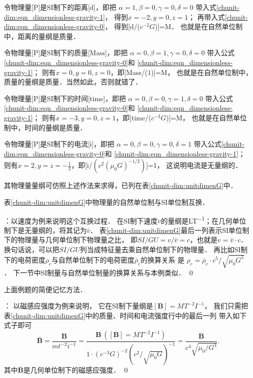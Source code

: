 令物理量[\si{P}]是SI制下的距离[\si{d}]，即把
$\alpha=1,\beta=0,\gamma=0,\delta=0$
带入式\eqref{chunit-dim:eqn_dimensionless-gravity-1}，
得到$x=-2,y=0,z=1$；
再带入式\eqref{chunit-dim:eqn_dimensionless-gravity-0}，
得到[\si{d}/($c^{-2}G$)]=\si{M}．
也就是在自然单位制中，距离的量纲是质量．

令物理量[\si{P}]是SI制下的质量[\si{Mass}]，即把
$\alpha=0,\beta=1,\gamma=0,\delta=0$
带入公式\eqref{chunit-dim:eqn_dimensionless-gravity-0}和
\eqref{chunit-dim:eqn_dimensionless-gravity-1}；
则有$x=0,y=0,z=0$，即[\si{Mass}/($1$)]=\si{M}，
也就是在自然单位制中，质量的量纲是质量．当然如此，否则就错了．

令物理量[\si{P}]是SI制下的时间[\si{time}]，即把
$\alpha=0,\beta=0,\gamma=1,\delta=0$
带入公式\eqref{chunit-dim:eqn_dimensionless-gravity-0}和
\eqref{chunit-dim:eqn_dimensionless-gravity-1}；
则有$x=-3,y=0,z=1$，即[\si{time}/($c^{-3}G$)]=\si{M}，
也就是在自然单位制中，时间的量纲是质量．

令物理量[\si{P}]是SI制下的电流[\si{i}]，即把
$\alpha=0,\beta=0,\gamma=0,\delta=1$
带入公式\eqref{chunit-dim:eqn_dimensionless-gravity-0}和
\eqref{chunit-dim:eqn_dimensionless-gravity-1}；
则有$x=2,y=z=-\frac{1}{2}$，即[\si{i}/$(c^2(\mu_0 G)^{-1/2})$]=\si{1}，
这说明电流是无量纲的．

其物理量量纲可仿照上述作法来求得，已列在表\ref{chunit-dim:unitdimenG}中．

\begin{example}
    表\ref{chunit-dim:unitdimenG}中物理量的自然单位制与SI单位制互换．
\end{example}
：以速度为例来说明这个互换过程．
在SI制下速度$v$的量纲是\si{LT^{-1}}；在几何单位制下是无量纲的，将其记为$\bar{v}$．
表\ref{chunit-dim:unitdimenG}最后一列表示SI单位制下的物理量与几何单位制下物理量之比，
即$SI/GU=v/\bar{v}=c$，也就是$v=\bar{v} \cdot c$．
换句话说，可以把$SI/GU$列当成特征量去乘自然单位制下的物理量．
再比如SI制下的电荷密度$\rho_e$与自然单位制下的电荷密度$\bar{\rho}_e$的换算关系
是 $\rho_e =\bar{\rho}_e \cdot c^{5} /\sqrt{\mu_0 G^5}$ ．
下一节中SI制量与自然单位制量的换算关系与本例类似．
\qed

\begin{example}
    上面例题的简便记忆方法．
\end{example}
：
以磁感应强度为例来说明，
它在SI制下量纲是$[\boldsymbol{B}]=\si{M^{}T^{-2}I^{-1}} $，
我们只需把表\ref{chunit-dim:unitdimenG}中的质量、时间和电流强度行中的最后一列
带入如下式子即可
\begin{equation*}
    \bar{\boldsymbol{B}} = \frac{\boldsymbol{B}}{m t^{-2} i^{-1}}
    = \dfrac{\boldsymbol{B} \ ( [\boldsymbol{B}] = \si{M^{}T^{-2}I^{-1}})}
    {1\cdot (c^{-3}G)^{-2} (c^2 /\sqrt{\mu_0 G})^{-1}}
    =\dfrac{\boldsymbol{B}} {c^{4} \sqrt{\mu_0/G^{3}}} .
\end{equation*}
其中$\bar{\boldsymbol{B}}$是几何单位制下的磁感应强度．
\qed



